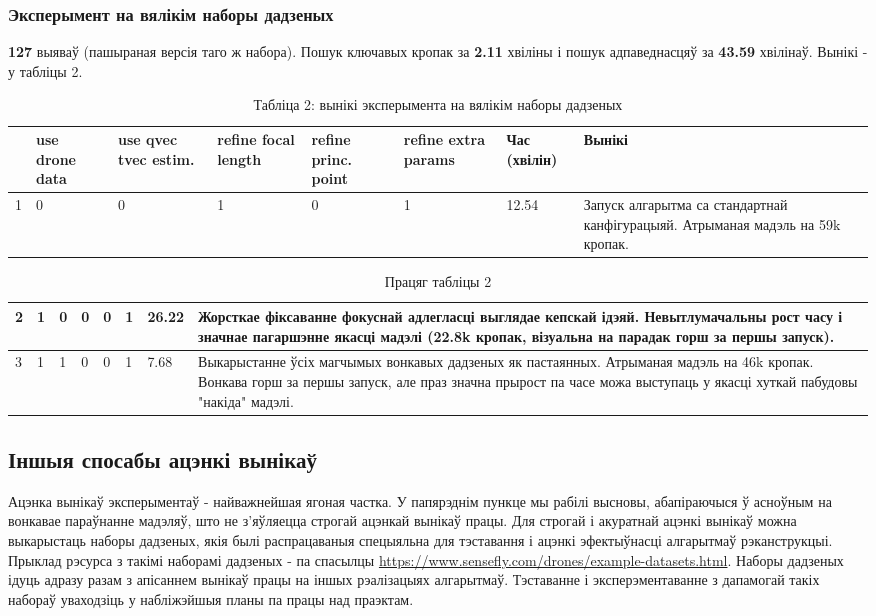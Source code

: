 \subsubsection*{Эксперымент на вялікім наборы дадзеных}
\textbf{127} выяваў (пашыраная версія таго ж набора). Пошук ключавых кропак за \textbf{2.11} хвіліны і пошук адпаведнасцяў за \textbf{43.59} хвілінаў. Вынікі - у табліцы 2.
\begin{table}[h!]
\centering
\begin{tabular}{ |m{1em}|m{2em}|m{2em}|m{2em}|m{2em}|m{2.5em}|m{3.2em}|m{12em}| }
 \hline
 & {\small use drone data} & {\small use qvec tvec estim. } & {\small refine focal length} & {\small refine princ. point} & {\small refine extra params} & Час (хвілін) & Вынікі \\
 \hline
 1 & 0 & 0 & 1 & 0 & 1 & 12.54 & Запуск алгарытма са стандартнай канфігурацыяй. Атрыманая мадэль на 59k кропак. \\
 \hline
\end{tabular}
\captionsetup{labelformat=empty}
\caption{Табліца 2: вынікі эксперымента на вялікім наборы дадзеных}
\end{table}

\begin{table}[h!]
\centering
\begin{tabular}{ |m{1em}|m{2em}|m{2em}|m{2em}|m{2em}|m{2.5em}|m{3.2em}|m{12em}| }
 \hline
 2 & 1 & 0 & 0 & 0 & 1 & 26.22 & Жорсткае фіксаванне фокуснай адлегласці выглядае кепскай ідэяй. Невытлумачальны рост часу і значнае пагаршэнне якасці мадэлі (22.8k кропак, візуальна на парадак горш за першы запуск). \\ 
 \hline
 3 & 1 & 1 & 0 & 0 & 1 & 7.68 & Выкарыстанне ўсіх магчымых вонкавых дадзеных як пастаянных. Атрыманая мадэль на 46k кропак. Вонкава горш за першы запуск, але праз значна прырост па часе можа выступаць у якасці хуткай пабудовы "накіда" мадэлі. \\ 
 \hline
\end{tabular}
\captionsetup{labelformat=empty}
\caption{Працяг табліцы 2}
\end{table}

\subsection*{Іншыя спосабы ацэнкі вынікаў}

Ацэнка вынікаў эксперыментаў - найважнейшая ягоная частка. У папярэднім пункце мы рабілі высновы, абапіраючыся ў асноўным на вонкавае параўнанне мадэляў, што не з'яўляецца строгай ацэнкай вынікаў працы. Для строгай і акуратнай ацэнкі вынікаў можна выкарыстаць наборы дадзеных, якія былі распрацаваныя спецыяльна для тэставання і ацэнкі эфектыўнасці алгарытмаў рэканструкцыі. Прыклад рэсурса з такімі наборамі дадзеных - па спасылцы \underline{https://www.sensefly.com/drones/example-datasets.html}. Наборы дадзеных ідуць адразу разам з апісаннем вынікаў працы на іншых рэалізацыях алгарытмаў. Тэставанне і эксперэментаванне з дапамогай такіх набораў уваходзіць у набліжэйшыя планы па працы над праэктам.

\newpage
